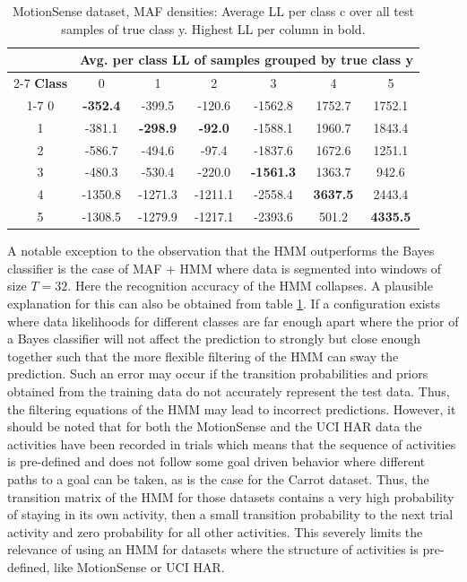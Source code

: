 \documentclass[11pt,titlepage,oneside,openany]{book}
\begin{document}
\begin{table}[H]
	\centering
	\tiny
	\begin{tabular}{c c c c c c c}
		\toprule
		\multirow[b]{2}{*}{} &
		\multicolumn{6}{c}{\bfseries Avg. per class LL of samples grouped by true class y}\\
		\cmidrule(lr){2-7}
		\bfseries Class & 0 & 1 & 2 & 3 & 4 & 5\\
		\cmidrule(lr){1-7}
		0 & \textbf{-352.4} & -399.5 & -120.6 & -1562.8 & 1752.7 & 1752.1 \\
		1 & -381.1 & \textbf{-298.9} & \textbf{-92.0} & -1588.1 & 1960.7 & 1843.4 \\
		2 & -586.7 & -494.6 & -97.4 & -1837.6 & 1672.6 & 1251.1 \\
		3 & -480.3 & -530.4 & -220.0 & \textbf{-1561.3} & 1363.7 & 942.6 \\
		4 & -1350.8 & -1271.3 & -1211.1 & -2558.4 & \textbf{3637.5} & 2443.4 \\
		5 & -1308.5 & -1279.9 & -1217.1 & -2393.6 & 501.2 & \textbf{4335.5} \\
		\bottomrule
	\end{tabular}
	\caption[MotionSense average LL]{\label{tab:llm} MotionSense dataset, MAF densities: Average LL per class c over all test samples of true class y. Highest LL per column in bold.}
\end{table}

\noindent A notable exception to the observation that the HMM outperforms the Bayes classifier is the case of MAF + HMM where data is segmented into windows of size $T=32$. Here the recognition accuracy of the HMM collapses. A plausible explanation for this can also be obtained from table \ref{tab:llm}. If a configuration exists where data likelihoods for different classes are far enough apart where the prior of a Bayes classifier will not affect the prediction to strongly but close enough together such that the more flexible filtering of the HMM can sway the prediction. Such an error may occur if the transition probabilities and priors obtained from the training data do not accurately represent the test data. Thus, the filtering equations of the HMM may lead to incorrect predictions. However, it should be noted that for both the MotionSense and the UCI HAR data the activities have been recorded in trials which means that the sequence of activities is pre-defined and does not follow some goal driven behavior where different paths to a goal can be taken, as is the case for the Carrot dataset. Thus, the transition matrix of the HMM for those datasets contains a very high probability of staying in its own activity, then a small transition probability to the next trial activity and zero probability for all other activities. This severely limits the relevance of using an HMM for datasets where the structure of activities is pre-defined, like MotionSense or UCI HAR.
\end{document}
